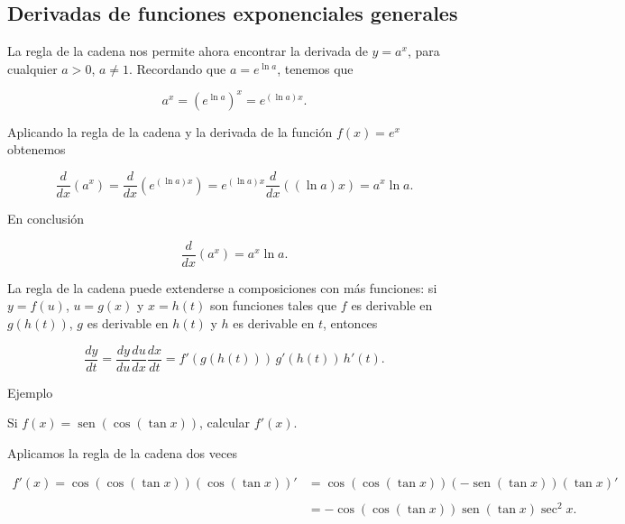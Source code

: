 \documentclass[
  letterpaper,
]{book}
\theoremstyle{plain}
\theoremstyle{remark}
\begin{document}
\subsection{Derivadas de funciones exponenciales
generales}\label{derivadas-de-funciones-exponenciales-generales}

La regla de la cadena nos permite ahora encontrar la derivada de
\(y=a^x\), para cualquier \(a>0\), \(a\neq 1\). Recordando que
\(a=e^{\ln a}\), tenemos que

\[
a^x=\left(e^{\ln a}\right)^x=e^{(\ln a) x }.
\]

Aplicando la regla de la cadena y la derivada de la función \(f(x)=e^x\)
obtenemos

\[
\frac{d}{dx}(a^x)=\frac{d}{dx}\left(e^{(\ln a) x }\right)=e^{(\ln a) x }\frac{d}{dx}\left((\ln a)x\right)=a^x\ln a.
\]

En conclusión

\[
\frac{d}{dx}(a^x)=a^x\ln a.
\]

La regla de la cadena puede extenderse a composiciones con más
funciones: si \(y=f(u)\), \(u=g(x)\) y \(x=h(t)\) son funciones tales
que \(f\) es derivable en \(g(h(t))\), \(g\) es derivable en \(h(t)\) y
\(h\) es derivable en \(t\), entonces

\[
\frac{dy}{dt}=\frac{dy}{du}\frac{du}{dx}\frac{dx}{dt}=f'(g(h(t)))\,g'(h(t))\,h'(t).
\]

Ejemplo

Si \(f(x)=\operatorname{sen}(\cos(\tan x))\), calcular \(f'(x)\).

\begin{tcolorbox}[enhanced jigsaw, opacityback=0, left=2mm, opacitybacktitle=0.6, toprule=.15mm, bottomrule=.15mm, colbacktitle=quarto-callout-tip-color!10!white, titlerule=0mm, bottomtitle=1mm, title=\textcolor{quarto-callout-tip-color}{\faLightbulb}\hspace{0.5em}{Solución}, toptitle=1mm, colframe=quarto-callout-tip-color-frame, colback=white, breakable, rightrule=.15mm, arc=.35mm, leftrule=.75mm, coltitle=black]

Aplicamos la regla de la cadena dos veces

\[
\begin{aligned}
f'(x)=\cos(\cos(\tan x))(\cos(\tan x))'&=\cos(\cos(\tan x))(-\operatorname{sen}(\tan x))(\tan x)'\\
\\
&=-\cos(\cos(\tan x))\operatorname{sen}(\tan x)\sec^2 x.
\end{aligned}
\]

\end{tcolorbox}
\end{document}
